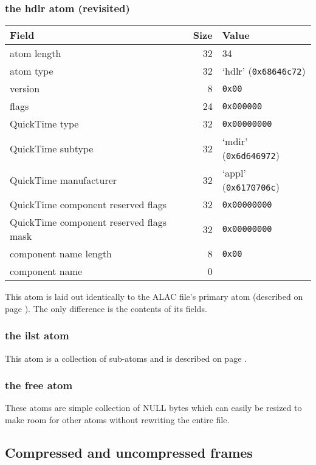 \subsubsection{the hdlr atom (revisited)}

\begin{tabular}{|l|r|l|}
\hline
Field & Size & Value \\
\hline
atom length & 32 & 34 \\
atom type & 32 & `hdlr' (\texttt{0x68646c72}) \\
\hline
version & 8 & \texttt{0x00} \\
flags & 24 & \texttt{0x000000} \\
QuickTime type & 32 & \texttt{0x00000000} \\
QuickTime subtype & 32 & `mdir' (\texttt{0x6d646972}) \\
QuickTime manufacturer & 32 & `appl' (\texttt{0x6170706c}) \\
QuickTime component reserved flags & 32 & \texttt{0x00000000} \\
QuickTime component reserved flags mask & 32 & \texttt{0x00000000} \\
component name length & 8 & \texttt{0x00} \\
component name & 0 & \\
\hline
\end{tabular}

This atom is laid out identically to the ALAC file's primary
 atom (described on page \pageref{alac_hdlr}).
The only difference is the contents of its fields.

\subsubsection{the ilst atom}

This atom is a collection of  sub-atoms
and is described on page \pageref{m4a_meta}.

\subsubsection{the free atom}

These atoms are simple collection of NULL bytes which can easily be
resized to make room for other atoms without rewriting the entire file.

\clearpage

\subsection{Compressed and uncompressed frames}


